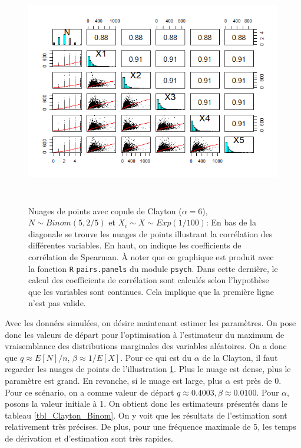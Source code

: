 \documentclass{article}
\begin{document}
		\begin{figure}[H]
			\centering
			\includegraphics[height=10cm]{Graph/scatterplot_Binom.png}
			\caption[Nuages de points du scénario \ref{scenario_Clayton_Binom}]
			{Nuages de points avec copule de Clayton ($\alpha = 6$), $N\sim Binom(5,2/5)$ et $X_i \sim X\sim Exp(1/100)$:
				En bas de la diagonale se trouve les nuages de points illustrant la corrélation des différentes variables. En haut, on indique les coefficients de corrélation de Spearman. À noter que ce graphique est produit avec la fonction \texttt{R} \texttt{pairs.panels} du module \texttt{psych}. Dans cette dernière, le calcul des coefficients de corrélation sont calculés selon l'hypothèse que les variables sont continues. Cela implique que la première ligne n'est pas valide.}
			\label{graph_scatterplot_Binom}
		\end{figure}
		
		Avec les données simulées, on désire maintenant estimer les paramètres. On pose donc les valeurs de départ pour l'optimisation à l'estimateur du maximum de vraisemblance des distributions marginales des variables aléatoires. On a donc que $q \approx E[N]/n$, $\beta \approx 1/E[X]$. Pour ce qui est du $\alpha$ de la Clayton, il faut regarder les nuages de points de  l'illustration \ref{graph_scatterplot_Binom}. Plus le nuage est dense, plus le paramètre est grand. En revanche, si le nuage est large, plus $\alpha$ est près de 0.\\
		
		Pour ce scénario, on a comme valeur de départ $q \approx 0.4003, \beta \approx 0.0100$. Pour $\alpha$, posons la valeur initiale à 1. On obtient donc les estimateurs présentés dans le tableau \ref{tbl_Clayton_Binom}. On y voit que les résultats de l'estimation sont relativement très précises. De plus, pour une fréquence maximale de 5, les temps de dérivation et d'estimation sont très rapides.
		
\end{document}

